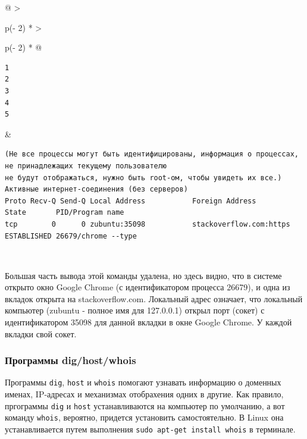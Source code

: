\documentclass{article}
\begin{document}
\begin{longtable}[]{@{}
  >{\raggedright\arraybackslash}p{(\columnwidth - 2\tabcolsep) * }
  >{\raggedright\arraybackslash}p{(\columnwidth - 2\tabcolsep) * }@{}}
\toprule
\endhead
\begin{minipage}[t]{\linewidth}\raggedright
\begin{verbatim}
1
2
3
4
5
\end{verbatim}
\end{minipage} & \begin{minipage}[t]{\linewidth}\raggedright
\begin{verbatim}
(Не все процессы могут быть идентифицированы, информация о процессах, не принадлежащих текущему пользователю
не будут отображаться, нужно быть root-ом, чтобы увидеть их все.)
Активные интернет-соединения (без серверов)
Proto Recv-Q Send-Q Local Address           Foreign Address         State       PID/Program name
tcp        0      0 zubuntu:35098           stackoverflow.com:https ESTABLISHED 26679/chrome --type
\end{verbatim}
\end{minipage} \\ \addlinespace
\bottomrule
\end{longtable}

Большая часть вывода этой команды удалена, но здесь видно, что в системе
открыто окно Google Chrome (с идентификатором процесса 26679), и одна из
вкладок открыта на stackoverflow.com. Локальный адрес означает, что
локальный компьютер (zubuntu - полное имя для 127.0.0.1) открыл порт
(сокет) с идентификатором 35098 для данной вкладки в окне Google Chrome.
У каждой вкладки свой сокет.

\hypertarget{dig-host-whois}{%
\subsubsection{\texorpdfstring{\protect\hyperlink{dig-host-whois}{}Программы
dig/host/whois}{Программы dig/host/whois}}\label{dig-host-whois}}

Программы \texttt{dig}, \texttt{host} и \texttt{whois} помогают узнавать
информацию о доменных именах, IP-адресах и механизмах отобрахения одних
в другие. Как правило, пргограммы \texttt{dig} и \texttt{host}
устанавливаются на компьютер по умолчанию, а вот команду \texttt{whois},
вероятно, придется установить самостоятельно. В Linux она
устанавливается путем выполнения \texttt{sudo\ apt-get\ install\ whois}
в терминале.
\end{document}
